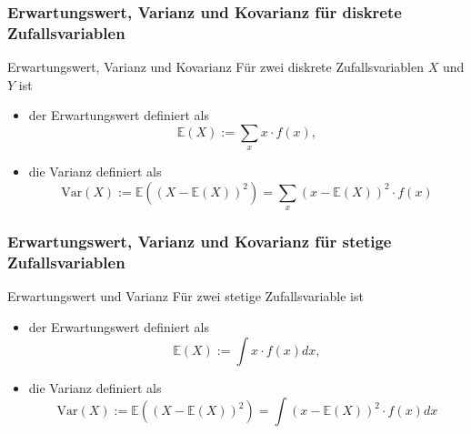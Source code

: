 \begin{frame}
\frametitle{Erwartungswert, Varianz und Kovarianz für diskrete Zufallsvariablen}
\begin{block}{Erwartungswert, Varianz und Kovarianz}
Für zwei diskrete Zufallsvariablen $X$ und $Y$ ist
\begin{itemize}[<+->]
\item der Erwartungswert definiert als
\[ \mathbb{E}(X) := \sum_x x\cdot f(x),
\]
\item die Varianz definiert als \[
\text{Var}(X) := \mathbb{E}\left(\left(X-\mathbb{E}(X)\right)^2\right) = \sum_x \left( x-\mathbb{E}(X)\right)^2\cdot f(x)
\]
\end{itemize}
\end{block}
\end{frame}
\begin{frame}
\frametitle{Erwartungswert, Varianz und Kovarianz für stetige Zufallsvariablen}
\begin{block}{Erwartungswert und Varianz}
Für zwei stetige Zufallsvariable ist
\begin{itemize}[<+->]
\item der Erwartungswert definiert als
\[ \mathbb{E}(X) := \int x\cdot f(x) dx,
\]
\item die Varianz definiert als \[
\text{Var}(X) := \mathbb{E}\left(\left(X-\mathbb{E}(X)\right)^2\right) = \int \left( x-\mathbb{E}(X)\right)^2\cdot f(x) dx
\]
\end{itemize}
\end{block}
\end{frame}
